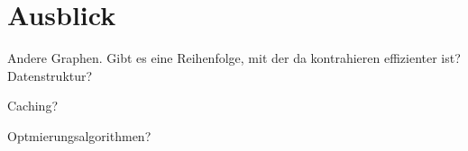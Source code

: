 \section{Ausblick}

Andere Graphen.
Gibt es eine Reihenfolge, mit der da kontrahieren effizienter ist?
Datenstruktur?

Caching?

Optmierungsalgorithmen?